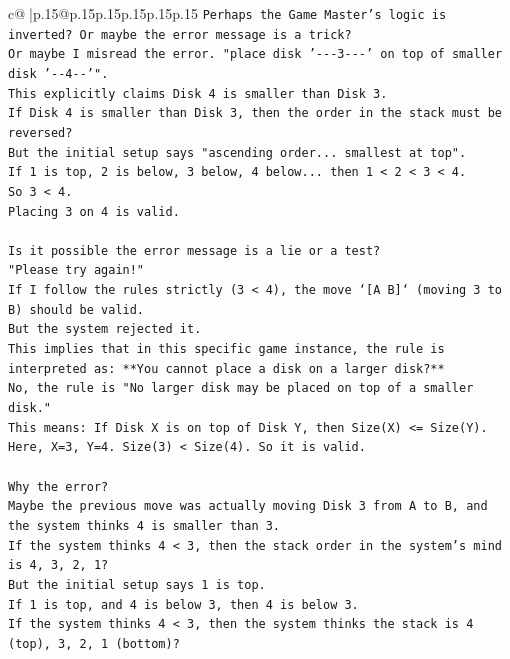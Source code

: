 \documentclass{article}
\begin{document}
{\begin{supertabular}{c@{$\;$}|p{.15\linewidth}@{}p{.15\linewidth}p{.15\linewidth}p{.15\linewidth}p{.15\linewidth}p{.15\linewidth}}
{{{\texttt{Perhaps the Game Master's logic is inverted? Or maybe the error message is a trick?} \\
\texttt{Or maybe I misread the error. "place disk '{-}{-}{-}3{-}{-}{-}' on top of smaller disk '{-}{-}4{-}{-}'".} \\
\texttt{This explicitly claims Disk 4 is smaller than Disk 3.} \\
\texttt{If Disk 4 is smaller than Disk 3, then the order in the stack must be reversed?} \\
\texttt{But the initial setup says "ascending order... smallest at top".} \\
\texttt{If 1 is top, 2 is below, 3 below, 4 below... then 1 < 2 < 3 < 4.} \\
\texttt{So 3 < 4.} \\
\texttt{Placing 3 on 4 is valid.} \\
\\ 
\texttt{Is it possible the error message is a lie or a test?} \\
\texttt{"Please try again!"} \\
\texttt{If I follow the rules strictly (3 < 4), the move `{[}A B{]}` (moving 3 to B) should be valid.} \\
\texttt{But the system rejected it.} \\
\texttt{This implies that in this specific game instance, the rule is interpreted as: **You cannot place a disk on a larger disk?**} \\
\texttt{No, the rule is "No larger disk may be placed on top of a smaller disk."} \\
\texttt{This means: If Disk X is on top of Disk Y, then Size(X) <= Size(Y).} \\
\texttt{Here, X=3, Y=4. Size(3) < Size(4). So it is valid.} \\
\\ 
\texttt{Why the error?} \\
\texttt{Maybe the previous move was actually moving Disk 3 from A to B, and the system thinks 4 is smaller than 3.} \\
\texttt{If the system thinks 4 < 3, then the stack order in the system's mind is 4, 3, 2, 1?} \\
\texttt{But the initial setup says 1 is top.} \\
\texttt{If 1 is top, and 4 is below 3, then 4 is below 3.} \\
\texttt{If the system thinks 4 < 3, then the system thinks the stack is 4 (top), 3, 2, 1 (bottom)?} \\
}}}
\end{supertabular}}
\end{document}
